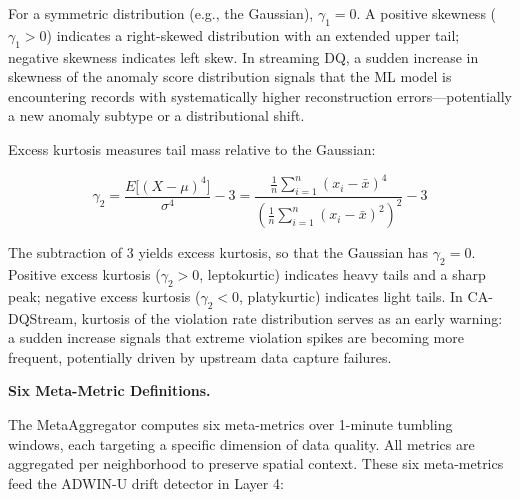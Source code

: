 For a symmetric distribution (e.g., the Gaussian), $\gamma_1 = 0$. A positive skewness ($\gamma_1 > 0$) indicates a right-skewed distribution with an extended upper tail; negative skewness indicates left skew. In streaming DQ, a sudden increase in skewness of the anomaly score distribution signals that the ML model is encountering records with systematically higher reconstruction errors---potentially a new anomaly subtype or a distributional shift.

Excess kurtosis measures tail mass relative to the Gaussian:

\begin{equation}
\gamma_2 = \frac{E\big[(X - \mu)^4\big]}{\sigma^4} - 3
        = \frac{\frac{1}{n}\sum_{i=1}^{n}(x_i - \bar{x})^4}
               {\left(\frac{1}{n}\sum_{i=1}^{n}(x_i - \bar{x})^2\right)^{2}} - 3
\label{eq:kurtosis}
\end{equation}

The subtraction of $3$ yields excess kurtosis, so that the Gaussian has $\gamma_2 = 0$. Positive excess kurtosis ($\gamma_2 > 0$, leptokurtic) indicates heavy tails and a sharp peak; negative excess kurtosis ($\gamma_2 < 0$, platykurtic) indicates light tails. In CA-DQStream, kurtosis of the violation rate distribution serves as an early warning: a sudden increase signals that extreme violation spikes are becoming more frequent, potentially driven by upstream data capture failures.

\bigskip
\noindent\textbf{Six Meta-Metric Definitions.}

The MetaAggregator computes six meta-metrics over 1-minute tumbling windows, each targeting a specific dimension of data quality. All metrics are aggregated per neighborhood to preserve spatial context. These six meta-metrics feed the ADWIN-U drift detector in Layer 4:

